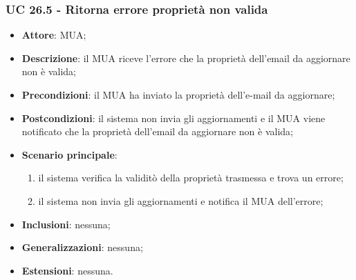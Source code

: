     \subsubsection{UC 26.5 - Ritorna errore proprietà non valida} \label{sec:UC26.5}
    \begin{itemize}
        \item \textbf{Attore}: MUA;
        \item \textbf{Descrizione}: il MUA riceve l'errore che la proprietà dell'email da aggiornare non è valida;
        \item \textbf{Precondizioni}: il MUA ha inviato la proprietà dell'e-mail da aggiornare;
        \item \textbf{Postcondizioni}: il sistema non invia gli aggiornamenti e il MUA viene notificato che la proprietà dell'email da aggiornare non è valida;
        \item \textbf{Scenario principale}:
            \begin{enumerate}
                \item il sistema verifica la validitò della proprietà trasmessa e trova un errore;
                \item il sistema non invia gli aggiornamenti e notifica il MUA dell'errore;
            \end{enumerate}
        \item \textbf{Inclusioni}: nessuna;
        \item \textbf{Generalizzazioni}: nessuna;
        \item \textbf{Estensioni}: nessuna.
    \end{itemize}